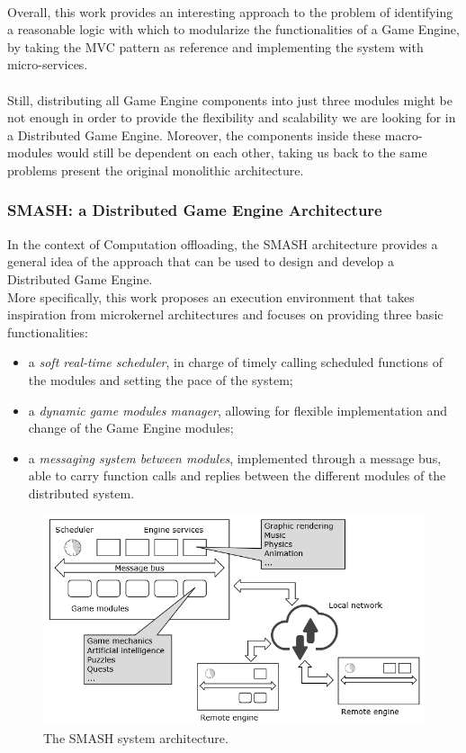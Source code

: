 \\ Overall, this work provides an interesting approach to the problem of identifying a reasonable logic with which to modularize the functionalities of a Game Engine, by taking the MVC pattern as reference and implementing the system with micro-services. \\ \\
Still, distributing all Game Engine components into just three modules might be not enough in order to provide the flexibility and scalability we are looking for in a Distributed Game Engine. Moreover, the components inside these macro-modules would still be dependent on each other, taking us back to the same problems present the original monolithic architecture.

\subsubsection{SMASH: a Distributed Game Engine Architecture \cite{womak:smash-distributed-game-engine}}
In the context of Computation offloading, the SMASH architecture provides a general idea of the approach that can be used to design and develop a Distributed Game Engine. \\
More specifically, this work proposes an execution environment that takes inspiration from microkernel architectures and focuses on providing three basic functionalities:
\begin{itemize}
	\item a \textit{soft real-time scheduler}, in charge of timely calling scheduled functions of the modules and setting the pace of the system;
	\item a \textit{dynamic game modules manager}, allowing for flexible implementation and change of the Game Engine modules;
	\item a \textit{messaging system between modules}, implemented through a message bus, able to carry function calls and replies between the different modules of the distributed system.
\end{itemize}
\begin{figure}[h!]
	\centering
	\includegraphics[width=0.9\linewidth]{"immagini/State-of-the-art/SMASH architecture"}
	\caption[The SMASH system architecture.]{The SMASH system architecture.}
	\label{fig:smash-architecture}
\end{figure}
